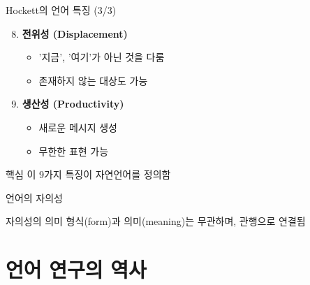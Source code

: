 \documentclass[aspectratio=169]{beamer}
\begin{document}
\begin{frame}{Hockett의 언어 특징 (3/3)}
\begin{enumerate}
\setcounter{enumi}{7}
\item \textbf{전위성 (Displacement)}
    \begin{itemize}
    \item '지금', '여기'가 아닌 것을 다룸
    \item 존재하지 않는 대상도 가능
    \end{itemize}
\item \textbf{생산성 (Productivity)}
    \begin{itemize}
    \item 새로운 메시지 생성
    \item 무한한 표현 가능
    \end{itemize}
\end{enumerate}

\vspace{0.5cm}
\begin{block}{핵심}
이 9가지 특징이 자연언어를 정의함
\end{block}
\end{frame}

\begin{frame}{언어의 자의성}
\begin{center}
\end{center}

\begin{alertblock}{자의성의 의미}
형식(form)과 의미(meaning)는 무관하며, 관행으로 연결됨
\end{alertblock}
\end{frame}

\section{언어 연구의 역사}
\end{document}
